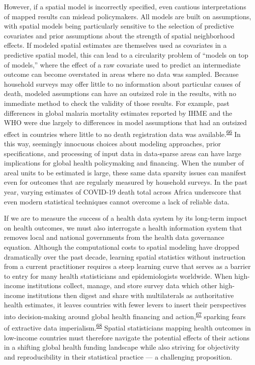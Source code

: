 \documentclass[
]{article}
\begin{document}
However, if a spatial model is incorrectly specified, even cautious interpretations of mapped results can mislead policymakers. All models are built on assumptions, with spatial models being particularly sensitive to the selection of predictive covariates and prior assumptions about the strength of spatial neighborhood effects. If modeled spatial estimates are themselves used as covariates in a predictive spatial model, this can lead to a circularity problem of ``models on top of models,'' where the effect of a raw covariate used to predict an intermediate outcome can become overstated in areas where no data was sampled. Because household surveys may offer little to no information about particular causes of death, modeled assumptions can have an outsized role in the results, with no immediate method to check the validity of those results. For example, past differences in global malaria mortality estimates reported by IHME and the WHO were due largely to differences in model assumptions that had an outsized effect in countries where little to no death registration data was available.\textsuperscript{\protect\hyperlink{ref-Tichenor2020}{66}} In this way, seemingly innocuous choices about modeling approaches, prior specifications, and processing of input data in data-sparse areas can have large implications for global health policymaking and financing. When the number of areal units to be estimated is large, these same data sparsity issues can manifest even for outcomes that are regularly measured by household surveys. In the past year, varying estimates of COVID-19 death total across Africa underscore that even modern statistical techniques cannot overcome a lack of reliable data.

If we are to measure the success of a health data system by its long-term impact on health outcomes, we must also interrogate a health information system that removes local and national governments from the health data governance equation. Although the computational costs to spatial modeling have dropped dramatically over the past decade, learning spatial statistics without instruction from a current practitioner requires a steep learning curve that serves as a barrier to entry for many health statisticians and epidemiologists worldwide. When high-income institutions collect, manage, and store survey data which other high-income institutions then digest and share with multilaterals as authoritative health estimates, it leaves countries with fewer levers to insert their perspectives into decision-making around global health financing and action,\textsuperscript{\protect\hyperlink{ref-Cinnamon2020a}{67}} sparking fears of extractive data imperialism.\textsuperscript{\protect\hyperlink{ref-Marchais2020}{68}} Spatial statisticians mapping health outcomes in low-income countries must therefore navigate the potential effects of their actions in a shifting global health funding landscape while also striving for objectivity and reproducibility in their statistical practice --- a challenging proposition.
\end{document}

